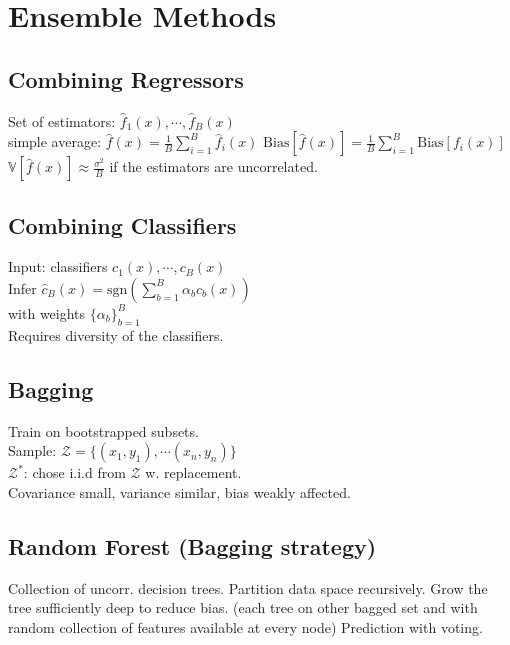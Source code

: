 \section*{Ensemble Methods}
\subsection*{Combining Regressors}
Set of estimators: $\hat{f}_1(x), \cdots, \hat{f}_B(x)$\\
simple average: $\hat{f}(x) = \frac{1}{B}\sum_{i=1}^B\hat{f}_i(x)$
$\mathrm{Bias}[\hat{f}(x)]=\frac{1}{B}\sum_{i=1}^B\mathrm{Bias}[f_i(x)]$\\
$\mathbb{V}[\hat{f}(x)]\approx\frac{\sigma^2}{B}$ if the estimators are uncorrelated.

\subsection*{Combining Classifiers}
Input: classifiers $c_1(x),\cdots,c_B(x)$\\
Infer $\hat{c}_B(x){=}\text{sgn}(\sum_{b=1}^B\alpha_b c_b(x))$\\
with weights $\{\alpha_b\}_{b=1}^B $\\
Requires diversity of the classifiers.

\subsection*{Bagging}
Train on bootstrapped subsets.\\
Sample: $\mathcal{Z}=\{(x_1,y_1),\cdots(x_n,y_n)\}$\\
$\mathcal{Z}^*$: chose i.i.d from $\mathcal{Z}$ w. replacement.\\
Covariance small, variance similar, bias weakly affected.

 \subsection*{Random Forest (Bagging strategy)}
 Collection of uncorr. decision trees.
 Partition data space recursively. Grow the tree sufficiently deep to reduce bias. (each tree on other bagged set and with random collection of features available at every node)
 Prediction with voting.


